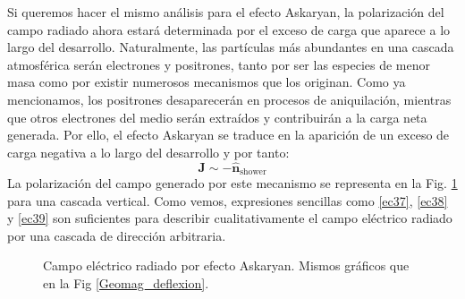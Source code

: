 \documentclass[12 pt, a4paper]{article} %
\numberwithin{equation}{section}
\numberwithin{figure}{section}
\numberwithin{table}{section}
\newcommand{\vect}[1]{\boldsymbol{\mathbf{#1}}}
\begin{document}
Si queremos hacer el mismo análisis para el efecto Askaryan, la polarización del campo radiado ahora estará determinada por el exceso de carga que aparece a lo largo del desarrollo. Naturalmente, las partículas más abundantes en una cascada atmosférica serán electrones y positrones, tanto por ser las especies de menor masa como por existir numerosos mecanismos que los originan. Como ya mencionamos, los positrones desaparecerán en procesos de aniquilación, mientras que otros electrones del medio serán extraídos y contribuirán a la carga neta generada. Por ello, el efecto Askaryan se traduce en la aparición de un exceso de carga negativa a lo largo del desarrollo y por tanto:
\begin{equation}
	\vect{J}\sim -\hat{\vect{n}}_{\text{shower}}\label{ec39}
\end{equation}
La polarización del campo generado por este mecanismo se representa en la Fig. \ref{Askaryan} para una cascada vertical. Como vemos, expresiones sencillas como \eqref{ec37}, \eqref{ec38} y \eqref{ec39} son suficientes para describir cualitativamente el campo eléctrico radiado por una cascada de dirección arbitraria.
\begin{figure}[H]
	\centering
	\hspace{10mm}
	\caption{Campo eléctrico radiado por efecto Askaryan. Mismos gráficos que en la Fig \ref{Geomag_deflexion}.}
	\label{Askaryan}
\end{figure}
\end{document}
